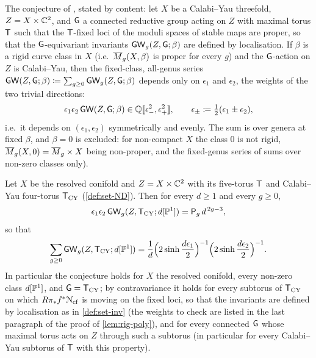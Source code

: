 The conjecture of \cite{BS}, stated by content: let $X$ be a Calabi--Yau threefold, $Z=X\times\mathbb{C}^2$, and $\mathsf{G}$ a connected reductive group acting on $Z$ with maximal torus $\mathsf{T}$ such that the $\mathsf{T}$-fixed loci of the moduli spaces of stable maps are proper, so that the $\mathsf{G}$-equivariant invariants $\mathsf{GW}_g(Z,\mathsf{G};\beta)$ are defined by localisation. If $\beta$ is a rigid curve class in $X$ (i.e.\ $\overline{M}_g(X,\beta)$ is proper for every $g$) and the $\mathsf{G}$-action on $Z$ is Calabi--Yau, then the fixed-class, all-genus series $\mathsf{GW}(Z,\mathsf{G};\beta)\coloneqq\sum_{g\geq 0}\mathsf{GW}_g(Z,\mathsf{G};\beta)$ depends only on $\epsilon_1$ and $\epsilon_2$, the weights of the two trivial directions:
\[
\epsilon_1\epsilon_2\,\mathsf{GW}(Z,\mathsf{G};\beta)\in\mathbb{Q}[\![ \epsilon_-^2,\epsilon_+^2 ]\!],\qquad \epsilon_\pm\coloneqq\tfrac12(\epsilon_1\pm\epsilon_2),
\]
i.e.\ it depends on $(\epsilon_1,\epsilon_2)$ symmetrically and evenly. The sum is over genera at fixed $\beta$, and $\beta=0$ is excluded: for non-compact $X$ the class $0$ is not rigid, $\overline{M}_g(X,0)=\overline{M}_g\times X$ being non-proper, and the fixed-genus series of \cite{BS} sums over non-zero classes only). 

\begin{cor}
\label{cor:rig-conj}
Let $X$ be the resolved conifold and $Z=X\times\mathbb{C}^2$ with its five-torus $\mathsf{T}$ and Calabi--Yau four-torus $\mathsf{T}_{\mathrm{CY}}$ (\cref{def:set-ND}). Then for every $d\geq 1$ and every $g\geq 0$,
\[
\epsilon_1\epsilon_2\,\mathsf{GW}_g(Z,\mathsf{T}_{\mathrm{CY}};d[\mathbb{P}^1])=\mathsf{P}_{g}\,d^{\,2g-3},
\]
so that
\[
\sum_{g\geq 0}\mathsf{GW}_g(Z,\mathsf{T}_{\mathrm{CY}};d[\mathbb{P}^1])=\frac{1}{d}\Big(2\sinh\frac{d\epsilon_1}{2}\Big)^{-1}\Big(2\sinh\frac{d\epsilon_2}{2}\Big)^{-1}.
\]
In particular the conjecture holds for $X$ the resolved conifold, every non-zero class $d[\mathbb{P}^1]$, and $\mathsf{G}=\mathsf{T}_{\mathrm{CY}}$; by contravariance it holds for every subtorus of $\mathsf{T}_{\mathrm{CY}}$ on which $R\pi_*f^*\mathcal{N}_{\mathrm{cf}}$ is moving on the fixed loci, so that the invariants are defined by localisation as in \cref{def:set-inv} (the weights to check are listed in the last paragraph of the proof of \cref{lem:rig-poly}), and for every connected $\mathsf{G}$ whose maximal torus acts on $Z$ through such a subtorus (in particular for every Calabi--Yau subtorus of $\mathsf{T}$ with this property).
\end{cor}

